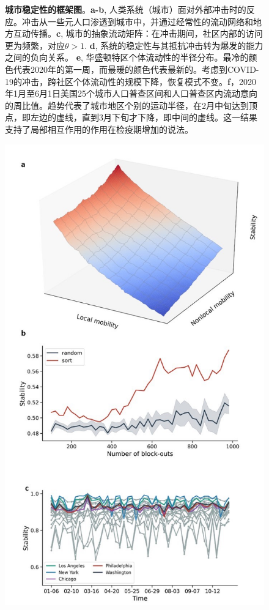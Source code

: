 \begin{figure}
    \caption{\textbf{城市稳定性的框架图}。\textbf{a-b}, 人类系统（城市）面对外部冲击时的反应。冲击从一些元人口渗透到城市中，并通过经常性的流动网络和地方互动传播。\textbf{c}, 城市的抽象流动矩阵：在冲击期间，社区内部的访问更为频繁，对应$\theta > 1$. \textbf{d}, 系统的稳定性与其抵抗冲击转为爆发的能力之间的负向关系。 \textbf{e}, 华盛顿特区个体流动性的半径分布。最冷的颜色代表2020年的第一周，而最暖的颜色代表最新的。考虑到COVID-19的冲击，跨社区个体流动性的规模下降，恢复模式不变。\textbf{f}，2020年1月至6月1日美国25个城市人口普查区间和人口普查区内流动意向的周比值。趋势代表了城市地区个别的运动半径，在2月中旬达到顶点，即左边的虚线，直到3月下旬才下降，即中间的虚线。这一结果支持了局部相互作用的作用在检疫期增加的说法。}
    \label{fig:allee1}
\end{figure}

\begin{figure}
    \centering
    \includegraphics[width = 0.9\linewidth]{Figs/Figure2.jpg}

\end{figure}

